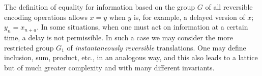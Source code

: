 \documentclass{article}[12pt, letter]
\begin{document}
The definition of equality for information based on the group $G$ of all reversible encoding operations allows $x = y$ when $y$ is, for example, a delayed version of $x$; $y_n = x_{n+a}$. In some situations, when one must act on information at a certain time, a delay is not permissible. In such a case we may consider the more restricted group $G_1$ of \textit{instantaneously reversible} translations. One may define inclusion, sum, product, etc., in an analogous way, and this also leads to a lattice but of much greater complexity and with many different invariants.
\end{document}
